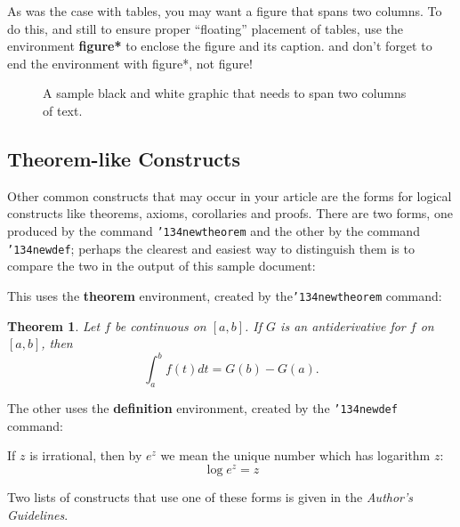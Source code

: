 \documentclass{sig-alternate-05-2015}
\begin{document}
	
	As was the case with tables, you may want a figure
	that spans two columns.  To do this, and still to
	ensure proper ``floating'' placement of tables, use the environment
	\textbf{figure*} to enclose the figure and its caption.
	and don't forget to end the environment with
	{figure*}, not {figure}!
	
	\begin{figure*}
		\centering
		\caption{A sample black and white graphic
			that needs to span two columns of text.}
	\end{figure*}
	
	\subsection{Theorem-like Constructs}
	Other common constructs that may occur in your article are
	the forms for logical constructs like theorems, axioms,
	corollaries and proofs.  There are
	two forms, one produced by the
	command \texttt{{\char'134}newtheorem} and the
	other by the command \texttt{{\char'134}newdef}; perhaps
	the clearest and easiest way to distinguish them is
	to compare the two in the output of this sample document:
	
	This uses the \textbf{theorem} environment, created by
	the\linebreak\texttt{{\char'134}newtheorem} command:
	\newtheorem{theorem}{Theorem}
	\begin{theorem}
		Let $f$ be continuous on $[a,b]$.  If $G$ is
		an antiderivative for $f$ on $[a,b]$, then
		\begin{displaymath}\int^b_af(t)dt = G(b) - G(a).\end{displaymath}
	\end{theorem}
	
	The other uses the \textbf{definition} environment, created
	by the \texttt{{\char'134}newdef} command:
	\begin{definition}
		If $z$ is irrational, then by $e^z$ we mean the
		unique number which has
		logarithm $z$: \begin{displaymath}{\log e^z = z}\end{displaymath}
	\end{definition}
	
	Two lists of constructs that use one of these
	forms is given in the
	\textit{Author's  Guidelines}.
	
\end{document}
